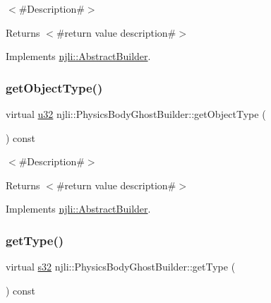 $<$\#\+Description\#$>$

\begin{DoxyReturn}{Returns}
$<$\#return value description\#$>$ 
\end{DoxyReturn}


Implements \mbox{\hyperlink{classnjli_1_1_abstract_builder_a902f73ea78031b06aca183a417f3413b}{njli\+::\+Abstract\+Builder}}.

\mbox{\label{classnjli_1_1_physics_body_ghost_builder_a6ee3e575f23f3e1c9a3eb57d75eb86cc}} 
\subsubsection{\texorpdfstring{get\+Object\+Type()}{getObjectType()}}
{\footnotesize\ttfamily virtual \mbox{\hyperlink{_util_8h_a10e94b422ef0c20dcdec20d31a1f5049}{u32}} njli\+::\+Physics\+Body\+Ghost\+Builder\+::get\+Object\+Type (\begin{DoxyParamCaption}{ }\end{DoxyParamCaption}) const\hspace{0.3cm}{\ttfamily [virtual]}}

$<$\#\+Description\#$>$

\begin{DoxyReturn}{Returns}
$<$\#return value description\#$>$ 
\end{DoxyReturn}


Implements \mbox{\hyperlink{classnjli_1_1_abstract_builder_a0f2d344fcf697b167f4f2b1122b5fb33}{njli\+::\+Abstract\+Builder}}.

\mbox{\label{classnjli_1_1_physics_body_ghost_builder_a631cda51d9aac43f52365928360463b6}} 
\subsubsection{\texorpdfstring{get\+Type()}{getType()}}
{\footnotesize\ttfamily virtual \mbox{\hyperlink{_util_8h_aa62c75d314a0d1f37f79c4b73b2292e2}{s32}} njli\+::\+Physics\+Body\+Ghost\+Builder\+::get\+Type (\begin{DoxyParamCaption}{ }\end{DoxyParamCaption}) const\hspace{0.3cm}{\ttfamily [virtual]}}

